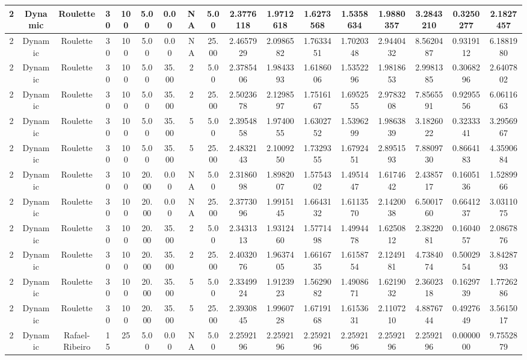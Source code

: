 \documentclass[a4paper]{article}
\begin{document}
\begin{center}
\begin{tabular}{ | c | c | c | c | c | c | c | c | c | c | c | c | c | c | c | c | c | }
		\hline
		2	&	Dynamic	&	Roulette	&	30	&	100	&	5.00	&	0.00	&	NA	&	5.00	&	2.3776118	&	1.9712618	&	1.6273568	&	1.5358634	&	1.9880357	&	3.2843210	&	0.3250277	&	2.1827457 \\
		\hline
		2	&	Dynamic	&	Roulette	&	30	&	100	&	5.00	&	0.00	&	NA	&	25.00	&	2.4657929	&	2.0986582	&	1.7633451	&	1.7020348	&	2.9440432	&	8.5620487	&	0.9319112	&	6.1881980 \\
		\hline
		2	&	Dynamic	&	Roulette	&	30	&	100	&	5.00	&	35.00	&	2	&	5.00	&	2.3785406	&	1.9843393	&	1.6186006	&	1.5352296	&	1.9818653	&	2.9981385	&	0.3068296	&	2.6407802 \\
		\hline
		2	&	Dynamic	&	Roulette	&	30	&	100	&	5.00	&	35.00	&	2	&	25.00	&	2.5023678	&	2.1298597	&	1.7516167	&	1.6952555	&	2.9783208	&	7.8565591	&	0.9295556	&	6.0611663 \\
		\hline
		2	&	Dynamic	&	Roulette	&	30	&	100	&	5.00	&	35.00	&	5	&	5.00	&	2.3954858	&	1.9740055	&	1.6302752	&	1.5396299	&	1.9863839	&	3.1826022	&	0.3233341	&	3.2956967 \\
		\hline
		2	&	Dynamic	&	Roulette	&	30	&	100	&	5.00	&	35.00	&	5	&	25.00	&	2.4832143	&	2.1009250	&	1.7329355	&	1.6792451	&	2.8951593	&	7.8809730	&	0.8664183	&	4.3590684 \\
		\hline
		2	&	Dynamic	&	Roulette	&	30	&	100	&	20.00	&	0.00	&	NA	&	5.00	&	2.3186098	&	1.8982007	&	1.5754302	&	1.4951447	&	1.6174642	&	2.4385717	&	0.1605136	&	1.5289966 \\
		\hline
		2	&	Dynamic	&	Roulette	&	30	&	100	&	20.00	&	0.00	&	NA	&	25.00	&	2.3773096	&	1.9915145	&	1.6643132	&	1.6113570	&	2.1420038	&	6.5001760	&	0.6641237	&	3.0311075 \\
		\hline
		2	&	Dynamic	&	Roulette	&	30	&	100	&	20.00	&	35.00	&	2	&	5.00	&	2.3431313	&	1.9312460	&	1.5771498	&	1.4994478	&	1.6250812	&	2.3822081	&	0.1604057	&	2.0867876 \\
		\hline
		2	&	Dynamic	&	Roulette	&	30	&	100	&	20.00	&	35.00	&	2	&	25.00	&	2.4032076	&	1.9637405	&	1.6616735	&	1.6158754	&	2.1249181	&	4.7384074	&	0.5002954	&	3.8428793 \\
		\hline
		2	&	Dynamic	&	Roulette	&	30	&	100	&	20.00	&	35.00	&	5	&	5.00	&	2.3349924	&	1.9123923	&	1.5629082	&	1.4908671	&	1.6219032	&	2.3602318	&	0.1629739	&	1.7726286 \\
		\hline
		2	&	Dynamic	&	Roulette	&	30	&	100	&	20.00	&	35.00	&	5	&	25.00	&	2.3930845	&	1.9960728	&	1.6719168	&	1.6153631	&	2.1107210	&	4.8876744	&	0.4927649	&	3.5615017 \\
		\hline
		2	&	Dynamic	&	Rafael-Ribeiro	&	15	&	25	&	5.00	&	0.00	&	NA	&	5.00	&	2.2592196	&	2.2592196	&	2.2592196	&	2.2592196	&	2.2592196	&	2.2592196	&	0.0000000	&	9.7552879 \\

\end{tabular}
\end{center}
\end{document}
